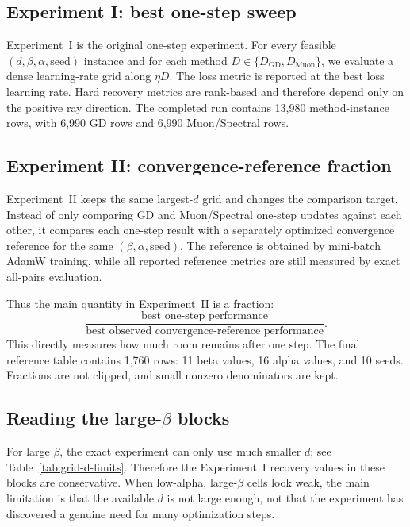 \documentclass[11pt]{article}
\newcommand{\Muon}{\mathrm{Muon}}
\newcommand{\GD}{\mathrm{GD}}
\begin{document}
\subsection{Experiment I: best one-step sweep}

Experiment~I is the original one-step experiment.  For every feasible
$(d,\beta,\alpha,\mathrm{seed})$ instance and for each method
$D\in\{D_{\GD},D_{\Muon}\}$, we evaluate a dense learning-rate grid along
$\eta D$.  The loss metric is reported at the best loss learning rate.
Hard recovery metrics are rank-based and therefore depend only on the
positive ray direction.  The completed run contains 13,980 method-instance
rows, with 6,990 GD rows and 6,990 Muon/Spectral rows.

\subsection{Experiment II: convergence-reference fraction}

Experiment~II keeps the same largest-$d$ grid and changes the comparison
target.  Instead of only comparing GD and Muon/Spectral one-step updates
against each other, it compares each one-step result with a separately
optimized convergence reference for the same
$(\beta,\alpha,\mathrm{seed})$.  The reference is obtained by mini-batch
AdamW training, while all reported reference metrics are still measured by
exact all-pairs evaluation.

Thus the main quantity in Experiment~II is a fraction:
\[
  \frac{\text{best one-step performance}}
       {\text{best observed convergence-reference performance}}.
\]
This directly measures how much room remains after one step.  The final
reference table contains 1,760 rows: 11 beta values, 16 alpha values, and 10
seeds.  Fractions are not clipped, and small nonzero denominators are kept.

\subsection{Reading the large-$\beta$ blocks}

For large $\beta$, the exact experiment can only use much smaller $d$; see
Table~\ref{tab:grid-d-limits}.  Therefore the Experiment~I recovery values in
these blocks are conservative.  When low-alpha, large-$\beta$ cells look
weak, the main limitation is that the available $d$ is not large enough, not
that the experiment has discovered a genuine need for many optimization
steps.
\end{document}
